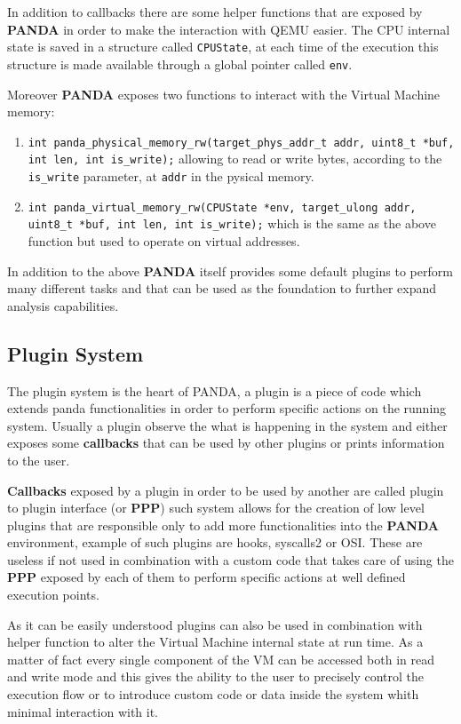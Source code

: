 In addition to callbacks there are some helper functions that are exposed by \textbf{PANDA} in order to make the interaction with QEMU easier. The CPU internal state is saved in a structure called \lstinline{CPUState}, at each time of the execution this structure is made available through a global pointer called \lstinline{env}. 

Moreover \textbf{PANDA} exposes two functions to interact with the Virtual Machine memory: 
\begin{enumerate}
    \item \lstinline{int panda_physical_memory_rw(target_phys_addr_t addr, uint8_t *buf, int len, int is_write);} allowing to read or write bytes, according to the \lstinline{is_write} parameter, at \lstinline{addr} in the pysical memory.
    \item \lstinline{int panda_virtual_memory_rw(CPUState *env, target_ulong addr, uint8_t *buf, int len, int is_write);} which is the same as the above function but used to operate on virtual addresses.
\end{enumerate}


In addition to the above \textbf{PANDA} itself provides some default plugins to perform many different tasks and that can be used as the foundation to further expand analysis capabilities.


\subsection{Plugin System}

The plugin system is the heart of PANDA, a plugin is a piece of code which extends panda functionalities in order to perform specific actions on the running system. Usually a plugin observe the what is happening in the system and either exposes some \textbf{callbacks} that can be used by other plugins or prints information to the user.

\textbf{Callbacks} exposed by a plugin in order to be used by another are called plugin to plugin interface (or \textbf{PPP}) such system allows for the creation of low level plugins that are responsible only to add more functionalities into the \textbf{PANDA} environment, example of such plugins are hooks, syscalls2 or OSI. These are useless if not used in combination with a custom code that takes care of using the \textbf{PPP} exposed by each of them to perform specific actions at well defined execution points.

As it can be easily understood plugins can also be used in combination with helper function to alter the Virtual Machine internal state at run time. As a matter of fact every single component of the VM can be accessed both in read and write mode and this gives the ability to the user to precisely control the execution flow or to introduce custom code or data inside the system whith minimal interaction with it. 


